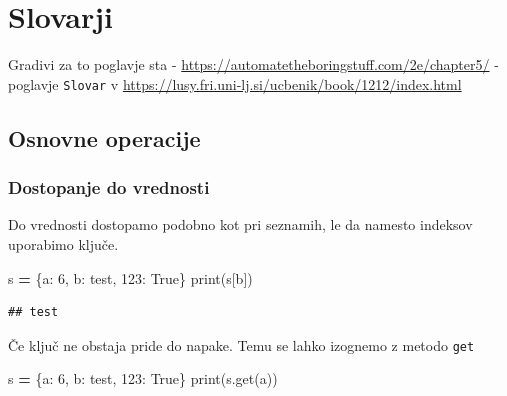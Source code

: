 \documentclass[
]{book}
\newenvironment{Shaded}{\begin{snugshade}}{\end{snugshade}}
\newcommand{\BuiltInTok}[1]{#1}
\newcommand{\DecValTok}[1]{\textcolor[rgb]{0.00,0.00,0.81}{#1}}
\newcommand{\NormalTok}[1]{#1}
\newcommand{\OperatorTok}[1]{\textcolor[rgb]{0.81,0.36,0.00}{\textbf{#1}}}
\newcommand{\StringTok}[1]{\textcolor[rgb]{0.31,0.60,0.02}{#1}}
\newcommand{\VariableTok}[1]{\textcolor[rgb]{0.00,0.00,0.00}{#1}}
\begin{document}
\hypertarget{slovarji}{%
\chapter{Slovarji}\label{slovarji}}

Gradivi za to poglavje sta
- \url{https://automatetheboringstuff.com/2e/chapter5/}
- poglavje \texttt{Slovar} v \url{https://lusy.fri.uni-lj.si/ucbenik/book/1212/index.html}

\hypertarget{osnovne-operacije}{%
\section{Osnovne operacije}\label{osnovne-operacije}}

\hypertarget{dostopanje-do-vrednosti}{%
\subsection{Dostopanje do vrednosti}\label{dostopanje-do-vrednosti}}

Do vrednosti dostopamo podobno kot pri seznamih, le da namesto indeksov uporabimo ključe.

\begin{Shaded}
\begin{Highlighting}[]
\NormalTok{s }\OperatorTok{=}\NormalTok{ \{}\StringTok{\textquotesingle{}a\textquotesingle{}}\NormalTok{: }\DecValTok{6}\NormalTok{, }\StringTok{\textquotesingle{}b\textquotesingle{}}\NormalTok{: }\StringTok{\textquotesingle{}test\textquotesingle{}}\NormalTok{, }\DecValTok{123}\NormalTok{: }\VariableTok{True}\NormalTok{\}}
\BuiltInTok{print}\NormalTok{(s[}\StringTok{\textquotesingle{}b\textquotesingle{}}\NormalTok{])}
\end{Highlighting}
\end{Shaded}

\begin{verbatim}
## test
\end{verbatim}

Če ključ ne obstaja pride do napake. Temu se lahko izognemo z metodo \texttt{get}

\begin{Shaded}
\begin{Highlighting}[]
\NormalTok{s }\OperatorTok{=}\NormalTok{ \{}\StringTok{\textquotesingle{}a\textquotesingle{}}\NormalTok{: }\DecValTok{6}\NormalTok{, }\StringTok{\textquotesingle{}b\textquotesingle{}}\NormalTok{: }\StringTok{\textquotesingle{}test\textquotesingle{}}\NormalTok{, }\DecValTok{123}\NormalTok{: }\VariableTok{True}\NormalTok{\}}
\BuiltInTok{print}\NormalTok{(s.get(}\StringTok{\textquotesingle{}a\textquotesingle{}}\NormalTok{))}
\end{Highlighting}
\end{Shaded}
\end{document}
